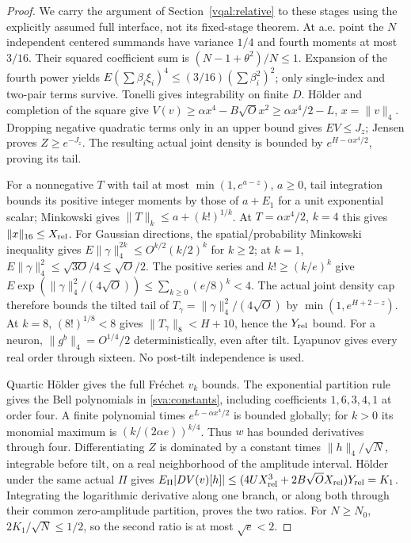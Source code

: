 \documentclass[11pt]{article}
\theoremstyle{plain}
\theoremstyle{definition}
\theoremstyle{remark}
\begin{document}
\begin{proof}
We carry the argument of Section~\ref{vqal:relative} to these stages
using the explicitly assumed full interface, not its fixed-stage theorem.
At a.e. point the $N$ independent centered summands have variance $1/4$
and fourth moments at most $3/16$. Their squared coefficient sum is
$(N-1+\theta^2)/N\le1$. Expansion of the fourth power yields
$E(\sum\beta_i\xi_i)^4\le(3/16)(\sum\beta_i^2)^2$; only single-index
and two-pair terms survive. Tonelli gives integrability on finite $D$.
H\"older and completion of the square give
$V(v)\ge\alpha x^4-B\sqrt O x^2\ge\alpha x^4/2-L$, $x=\|v\|_4$.
Dropping negative quadratic terms only in an upper bound gives
$EV\le J_z$; Jensen proves $Z\ge e^{-J_z}$. The resulting actual
joint density is bounded by $e^{H-\alpha x^4/2}$, proving its tail.

For a nonnegative $T$ with tail at most $\min(1,e^{a-z})$, $a\ge0$,
tail integration bounds its positive integer moments by those of
$a+E_1$ for a unit exponential scalar; Minkowski gives
$\|T\|_k\le a+(k!)^{1/k}$. At $T=\alpha x^4/2$, $k=4$ this gives
$\|x\|_{16}\le X_{\rm rel}$. For Gaussian directions, the
spatial/probability Minkowski inequality gives
$E\|\gamma\|_4^{2k}\le O^{k/2}(k/2)^k$ for $k\ge2$; at $k=1$,
$E\|\gamma\|_4^2\le\sqrt{3O}/4\le\sqrt O/2$.
The positive series and $k!\ge(k/e)^k$ give
$E\exp(\|\gamma\|_4^2/(4\sqrt O))\le\sum_{k\ge0}(e/8)^k<4$.
The actual joint density cap therefore bounds the tilted tail of
$T_\gamma=\|\gamma\|_4^2/(4\sqrt O)$ by
$\min(1,e^{H+2-z})$. At $k=8$, $(8!)^{1/8}<8$ gives
$\|T_\gamma\|_8<H+10$, hence the $Y_{\rm rel}$ bound.
For a neuron, $\|g^b\|_4=O^{1/4}/2$ deterministically, even after tilt.
Lyapunov gives every real order through sixteen. No post-tilt
independence is used.

Quartic H\"older gives the full Fr\'echet $v_k$ bounds. The exponential
partition rule gives the Bell polynomials in \eqref{sva:constants},
including coefficients $1,6,3,4,1$ at order four. A finite polynomial
times $e^{L-\alpha x^4/2}$ is bounded globally; for $k>0$ its monomial
maximum is $(k/(2\alpha e))^{k/4}$. Thus $w$ has bounded derivatives
through four. Differentiating $Z$ is dominated by a constant times
$\|h\|_4/\sqrt N$, integrable before tilt, on a real neighborhood of
the amplitude interval. H\"older under the same actual $\Pi$ gives
$E_\Pi|DV(v)[h]|\le(4UX_{\rm rel}^3+2B\sqrt O X_{\rm rel})Y_{\rm rel}=K_1$.
Integrating the logarithmic derivative along one branch, or along both
through their common zero-amplitude partition, proves the two ratios.
For $N\ge N_0$, $2K_1/\sqrt N\le1/2$, so the second ratio is at most
$\sqrt e<2$.


\end{proof}
\end{document}
